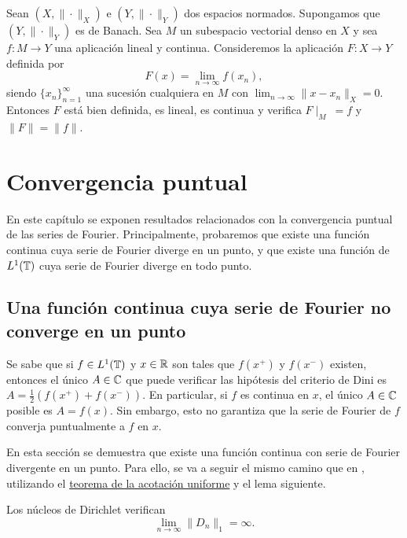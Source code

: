 \documentclass[a4paper, 12pt, oneside]{book}
\begin{document}
\begin{theorem}\label{1.3.3}
    Sean $(X,\|\cdot\|_X)$ e $(Y,\|\cdot\|_Y)$ dos espacios normados. Supongamos que $(Y,\|\cdot\|_Y)$ es de Banach. Sea $M$ un subespacio vectorial denso en $X$ y sea $f \colon M \to Y$ una aplicación lineal y continua. Consideremos la aplicación $F \colon X \to Y$ definida por 
    \[F(x) = \lim_{n\to\infty} f(x_n),\]
    siendo $\{x_n\}_{n=1}^\infty$ una sucesión cualquiera en $M$ con $\lim_{n\to\infty} \|x-x_n\|_X = 0$. Entonces $F$ está bien definida, es lineal, es continua y verifica $F\! \mid_M \ = f$ y $\|F\| = \|f\|$.
\end{theorem}

\chapter{Convergencia puntual}

En este capítulo se exponen resultados relacionados con la convergencia puntual de las series de Fourier. Principalmente, probaremos que existe una función continua cuya serie de Fourier diverge en un punto, y que existe una función de $L^1(\mathbb T)$ cuya serie de Fourier diverge en todo punto.

\section{Una función continua cuya serie de Fourier no converge en un punto}

Se sabe que si $f \in L^1(\mathbb T)$ y $x \in \mathbb R$ son tales que $f(x^+)$ y $f(x^-)$ existen, entonces el único $A \in \mathbb C$ que puede verificar las hipótesis del criterio de Dini es $A = \frac{1}{2}(f(x^+)+f(x^-))$. En particular, si $f$ es continua en $x$, el único $A \in \mathbb C$ posible es $A = f(x)$. Sin embargo, esto no garantiza que la serie de Fourier de $f$ converja puntualmente a $f$ en $x$.

En esta sección se demuestra que existe una función continua con serie de Fourier divergente en un punto. Para ello, se va a seguir el mismo camino que en \cite{fierros}, utilizando el \hyperref[1.2.2]{\color{blue}teorema de la acotación uniforme} y el lema siguiente.

\begin{lemma}\label{2.1.1}
    Los núcleos de Dirichlet verifican \[\lim_{n \to \infty} \|D_n\|_1 = \infty.\]
\end{lemma}
\end{document}
